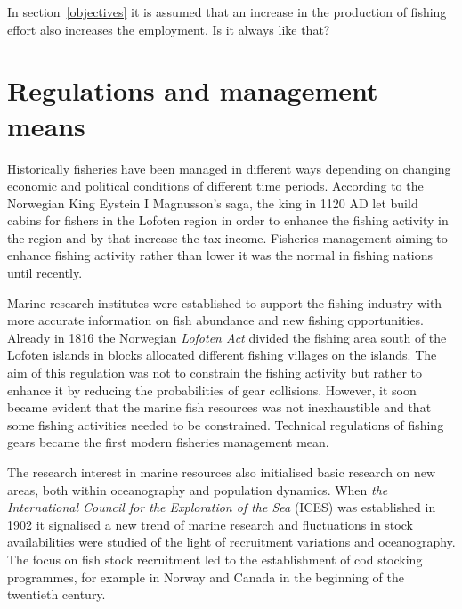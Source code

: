 \documentclass[11pt,fleqn]{book} %
\begin{document}
\begin{exercise}
In section~\ref{objectives} it is assumed that an increase in the production of fishing effort also increases the employment. Is it always like that?
\end{exercise}

\chapter{Regulations and management means} \label{chapter 10}

Historically fisheries have been managed in different ways depending on changing economic and political conditions of different time periods. According to the Norwegian King Eystein I Magnusson's saga, the king in 1120 AD let build cabins for fishers in the Lofoten region in order to enhance the fishing activity in the region and by that increase the tax income\cite{Christensen1996NorwegianDevelopments}. Fisheries management aiming to enhance fishing activity rather than lower it was the normal in fishing nations until recently. 

Marine research institutes were established to support the fishing industry with more accurate information on fish abundance and new fishing opportunities. Already in 1816 the Norwegian \textit{Lofoten Act} divided the fishing area south of the Lofoten islands in blocks allocated different fishing villages on the islands\cite{Eide2009}. The aim of this regulation was not to constrain the fishing activity but rather to enhance it by reducing the probabilities of gear collisions. However, it soon became evident that the marine fish resources was not inexhaustible and that some fishing activities needed to be constrained. Technical regulations of fishing gears became the first modern fisheries management mean.

The research interest in marine resources also initialised basic research on new areas, both within oceanography and population dynamics. When \textit{the International Council for the Exploration of the Sea} (ICES) was established in 1902 it signalised a new trend of marine research and fluctuations in stock availabilities were studied of the light of recruitment variations and oceanography\cite{HJORT1914}. The focus on fish stock recruitment led to the establishment of cod stocking programmes, for example in Norway and Canada in the beginning of the twentieth century.
\end{document}
